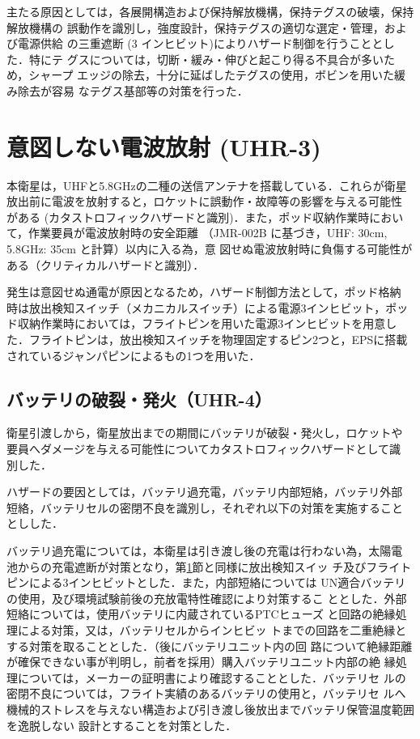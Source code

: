主たる原因としては，各展開構造および保持解放機構，保持テグスの破壊，保持解放機構の
誤動作を識別し，強度設計，保持テグスの適切な選定・管理，および電源供給
の三重遮断 (3 インヒビット)によりハザード制御を行うこととした．特にテ
グスについては，切断・緩み・伸びと起こり得る不具合が多いため，シャープ
エッジの除去，十分に延ばしたテグスの使用，ボビンを用いた緩み除去が容易
なテグス基部等の対策を行った．

\section{意図しない電波放射 (UHR-3)}\label{5_1_UHR3}
本衛星は，UHFと5.8GHzの二種の送信アンテナを搭載している．これらが衛星
放出前に電波を放射すると，ロケットに誤動作・故障等の影響を与える可能性
がある (カタストロフィックハザードと識別)．また，ポッド収納作業時において，作業要員が電波放射時の安全距離
（JMR-002B に基づき，UHF: 30cm, 5.8GHz: 35cm と計算）以内に入る為，意
図せぬ電波放射時に負傷する可能性がある（クリティカルハザードと識別）．

発生は意図せぬ通電が原因となるため，ハザード制御方法として，ポッド格納
時は放出検知スイッチ（メカニカルスイッチ）による電源3インヒビット，ポッ
ド収納作業時においては，フライトピンを用いた電源3インヒビットを用意し
た．フライトピンは，放出検知スイッチを物理固定するピン2つと，EPSに搭載
されているジャンパピンによるもの1つを用いた．

\subsection{バッテリの破裂・発火（UHR-4）}
衛星引渡しから，衛星放出までの期間にバッテリが破裂・発火し，ロケットや
要員へダメージを与える可能性についてカタストロフィックハザードとして識
別した．

ハザードの要因としては，バッテリ過充電，バッテリ内部短絡，バッテリ外部
短絡，バッテリセルの密閉不良を識別し，それぞれ以下の対策を実施すること
としした．

バッテリ過充電については，本衛星は引き渡し後の充電は行わない為，太陽電
池からの充電遮断が対策となり，第\ref{5_1_UHR3}節と同様に放出検知スイッ
チ及びフライトピンによる3インヒビットとした．また，内部短絡については
UN適合バッテリの使用，及び環境試験前後の充放電特性確認により対策するこ
ととした．外部短絡については，使用バッテリに内蔵されているPTCヒューズ
と回路の絶縁処理による対策，又は，バッテリセルからインヒビッ
  トまでの回路を二重絶縁とする対策を取ることとした．（後にバッテリユニット内の回
  路について絶縁距離が確保できない事が判明し，前者を採用）購入バッテリユニット内部の絶
縁処理については，メーカーの証明書により確認することとした．バッテリセ
ルの密閉不良については，フライト実績のあるバッテリの使用と，バッテリセ
ルへ機械的ストレスを与えない構造および引き渡し後放出までバッテリ保管温度範囲を逸脱しない
設計とすることを対策とした．

